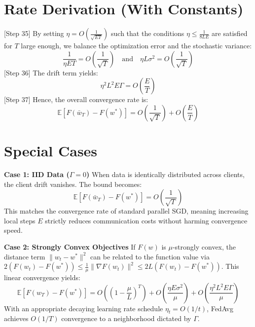 \documentclass{article}
\begin{document}
\section*{Rate Derivation (With Constants)}
[Step 35] By setting $\eta = O\left(\frac{1}{\sqrt{ET}}\right)$ such that the conditions $\eta \leq \frac{1}{8LE}$ are satisfied for $T$ large enough, we balance the optimization error and the stochastic variance:
$$ \frac{1}{\eta ET} = O\left(\frac{1}{\sqrt{T}}\right) \quad \text{and} \quad \eta L \sigma^2 = O\left(\frac{1}{\sqrt{T}}\right) $$
[Step 36] The drift term yields:
$$ \eta^2 L^2 E \Gamma = O\left(\frac{E}{T}\right) $$
[Step 37] Hence, the overall convergence rate is:
$$ \mathbb{E}[F(\bar{w}_T) - F(w^*)] = O\left(\frac{1}{\sqrt{T}}\right) + O\left(\frac{E}{T}\right) $$

\section*{Special Cases}
\textbf{Case 1: IID Data ($\Gamma = 0$)}
When data is identically distributed across clients, the client drift vanishes. The bound becomes:
$$ \mathbb{E}[F(\bar{w}_T) - F(w^*)] = O\left(\frac{1}{\sqrt{T}}\right) $$
This matches the convergence rate of standard parallel SGD, meaning increasing local steps $E$ strictly reduces communication costs without harming convergence speed.

\textbf{Case 2: Strongly Convex Objectives}
If $F(w)$ is $\mu$-strongly convex, the distance term $\|w_t - w^*\|^2$ can be related to the function value via $2(F(w_t) - F(w^*)) \leq \frac{1}{\mu}\|\nabla F(w_t)\|^2 \leq 2L(F(w_t) - F(w^*))$. This linear convergence yields:
$$ \mathbb{E}[F(w_T) - F(w^*)] = O\left( \left(1 - \frac{\mu}{L}\right)^T \right) + O\left(\frac{\eta E \sigma^2}{\mu}\right) + O\left(\frac{\eta^2 L^2 E \Gamma}{\mu}\right) $$
With an appropriate decaying learning rate schedule $\eta_t = O(1/t)$, FedAvg achieves $O(1/T)$ convergence to a neighborhood dictated by $\Gamma$.

\end{document}
